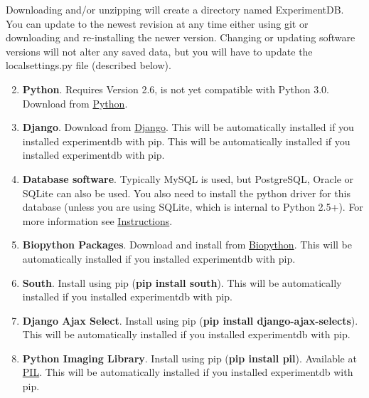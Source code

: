 \documentclass[letterpaper,10pt,english]{sphinxmanual}
\begin{document}
Downloading and/or unzipping will create a directory named ExperimentDB.  You can update to the newest revision at any time either using git or downloading and re-installing the newer version.  Changing or updating software versions will not alter any saved data, but you will have to update the localsettings.py file (described below).

\begin{enumerate}
\setcounter{enumi}{1}
\item {} 
\textbf{Python}.  Requires Version 2.6, is not yet compatible with Python 3.0.  Download from \href{http://www.python.org/download}{Python}.


\item {} 
\textbf{Django}.  Download from \href{http://www.djangoproject.com/download/}{Django}.  This will be automatically installed if you installed experimentdb with pip.  This will be automatically installed if you installed experimentdb with pip.


\item {} 
\textbf{Database software}.  Typically MySQL is used, but PostgreSQL, Oracle or SQLite can also be used.  You also need to install the python driver for this database (unless you are using SQLite, which is internal to Python 2.5+).  For more information see \href{http://docs.djangoproject.com/en/dev/topics/install/database-installation}{Instructions}.


\item {} 
\textbf{Biopython Packages}.  Download and install from \href{http://biopython.org}{Biopython}. This will be automatically installed if you installed experimentdb with pip.


\item {} 
\textbf{South}.  Install using pip (\textbf{pip install south}).  This will be automatically installed if you installed experimentdb with pip.


\item {} 
\textbf{Django Ajax Select}.  Install using pip (\textbf{pip install django-ajax-selects}).  This will be automatically installed if you installed experimentdb with pip.


\item {} 
\textbf{Python Imaging Library}.  Install using pip (\textbf{pip install pil}).  Available at \href{http://www.pythonware.com/products/pil/}{PIL}.  This will be automatically installed if you installed experimentdb with pip.


\end{enumerate}
\end{document}
